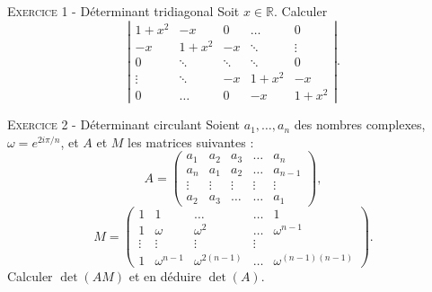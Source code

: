\documentclass[11pt]{article}
\begin{document}
 

\begin{center}\textsc{{\huge }}\end{center}



\vskip0.3cm\noindent\textsc{Exercice 1} - Déterminant tridiagonal
\vskip0.2cm
Soit $x\in\mathbb R$. Calculer
$$\left|
\begin{array}{ccccc}
1+x^2&-x&0&\dots&0\\
-x&1+x^2&-x&\ddots&\vdots\\
0&\ddots&\ddots&\ddots&0\\
\vdots&\ddots&-x&1+x^2&-x\\
0&\dots&0&-x&1+x^2
\end{array}
\right|.
$$




\vskip0.3cm\noindent\textsc{Exercice 2} - Déterminant circulant
\vskip0.2cm
Soient $a_1,\dots,a_n$ des nombres complexes, $\omega=e^{2i\pi/n}$, et $A$ et $M$ les matrices suivantes :
$$A=\left(
\begin{array}{ccccc}
a_1&a_2&a_3&\dots&a_n\\
a_n&a_1&a_2&\dots&a_{n-1}\\
\vdots&\vdots&\vdots&\vdots&\vdots\\
a_2&a_3&\dots&\dots&a_{1}
\end{array}\right),$$
$$M=\left(
\begin{array}{ccccc}
1&1&\dots&\dots&1\\
1&\omega&\omega^2&\dots&\omega^{n-1}\\
\vdots&\vdots&\vdots&\vdots\\
1&\omega^{n-1}&\omega^{2(n-1)}&\dots&\omega^{(n-1)(n-1)}
\end{array}
\right).$$
Calculer $\det(AM)$ et en déduire $\det(A)$.




\vskip0.5cm

\end{document}
